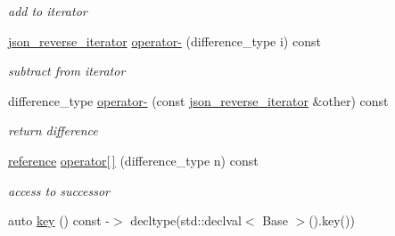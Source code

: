 \begin{DoxyCompactItemize}
\begin{DoxyCompactList}\small\item\em add to iterator \end{DoxyCompactList}\item 
\mbox{\label{classnlohmann_1_1detail_1_1json__reverse__iterator_a549c6eb10b6434eaf772f71d129a6d79}} 
\hyperlink{classnlohmann_1_1detail_1_1json__reverse__iterator}{json\+\_\+reverse\+\_\+iterator} \hyperlink{classnlohmann_1_1detail_1_1json__reverse__iterator_a549c6eb10b6434eaf772f71d129a6d79}{operator-\/} (difference\+\_\+type i) const
\begin{DoxyCompactList}\small\item\em subtract from iterator \end{DoxyCompactList}\item 
\mbox{\label{classnlohmann_1_1detail_1_1json__reverse__iterator_aaaa6c0b1d74e74e35e5f7b56dfd6c5d1}} 
difference\+\_\+type \hyperlink{classnlohmann_1_1detail_1_1json__reverse__iterator_aaaa6c0b1d74e74e35e5f7b56dfd6c5d1}{operator-\/} (const \hyperlink{classnlohmann_1_1detail_1_1json__reverse__iterator}{json\+\_\+reverse\+\_\+iterator} \&other) const
\begin{DoxyCompactList}\small\item\em return difference \end{DoxyCompactList}\item 
\mbox{\label{classnlohmann_1_1detail_1_1json__reverse__iterator_a8ed9e445e03c49c46612eb7f7d55bb61}} 
\hyperlink{classnlohmann_1_1detail_1_1json__reverse__iterator_a42f51a69bac7b2aebb613b2164e457f1}{reference} \hyperlink{classnlohmann_1_1detail_1_1json__reverse__iterator_a8ed9e445e03c49c46612eb7f7d55bb61}{operator\mbox{[}$\,$\mbox{]}} (difference\+\_\+type n) const
\begin{DoxyCompactList}\small\item\em access to successor \end{DoxyCompactList}\item 
\mbox{\label{classnlohmann_1_1detail_1_1json__reverse__iterator_adc648a641e8e9a1072c5abd56ad06401}} 
auto \hyperlink{classnlohmann_1_1detail_1_1json__reverse__iterator_adc648a641e8e9a1072c5abd56ad06401}{key} () const -\/$>$ decltype(std\+::declval$<$ Base $>$().key())

\end{DoxyCompactItemize}
